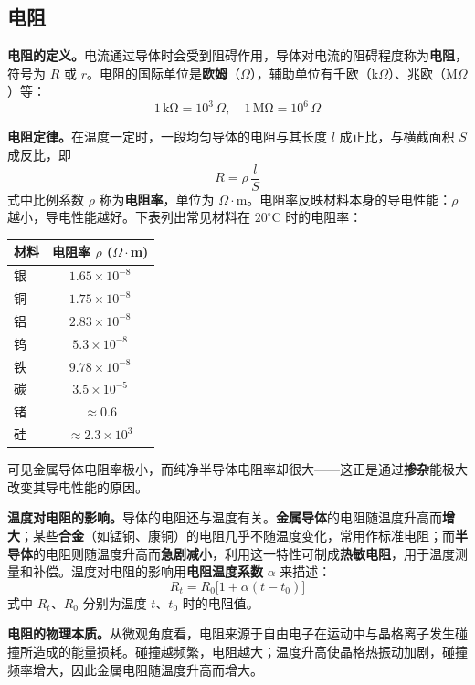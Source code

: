 \documentclass[12pt,UTF8]{ctexbook}
\begin{document}
\subsection{电阻}

\textbf{电阻的定义。}电流通过导体时会受到阻碍作用，导体对电流的阻碍程度称为\textbf{电阻}，符号为 $R$ 或 $r$。电阻的国际单位是\textbf{欧姆}（$\Omega$），辅助单位有千欧（k$\Omega$）、兆欧（M$\Omega$）等：
\[
1\,\mathrm{k\Omega} = 10^3\,\Omega, \quad 1\,\mathrm{M\Omega} = 10^6\,\Omega
\]

\textbf{电阻定律。}在温度一定时，一段均匀导体的电阻与其长度 $l$ 成正比，与横截面积 $S$ 成反比，即
\[
R = \rho \, \frac{l}{S}
\]
式中比例系数 $\rho$ 称为\textbf{电阻率}，单位为 $\Omega\cdot\mathrm{m}$。电阻率反映材料本身的导电性能：$\rho$ 越小，导电性能越好。下表列出常见材料在 $20^{\circ}\mathrm{C}$ 时的电阻率：

\begin{center}
\begin{tabular}{lc}
\hline
\textbf{材料} & \textbf{电阻率 $\rho$ ($\Omega\cdot$m)} \\
\hline
银 & $1.65 \times 10^{-8}$ \\
铜 & $1.75 \times 10^{-8}$ \\
铝 & $2.83 \times 10^{-8}$ \\
钨 & $5.3 \times 10^{-8}$ \\
铁 & $9.78 \times 10^{-8}$ \\
碳 & $3.5 \times 10^{-5}$ \\
锗 & $\approx 0.6$ \\
硅 & $\approx 2.3 \times 10^{3}$ \\
\hline
\end{tabular}
\end{center}

可见金属导体电阻率极小，而纯净半导体电阻率却很大——这正是通过\textbf{掺杂}能极大改变其导电性能的原因。

\textbf{温度对电阻的影响。}导体的电阻还与温度有关。\textbf{金属导体}的电阻随温度升高而\textbf{增大}；某些\textbf{合金}（如锰铜、康铜）的电阻几乎不随温度变化，常用作标准电阻；而\textbf{半导体}的电阻则随温度升高而\textbf{急剧减小}，利用这一特性可制成\textbf{热敏电阻}，用于温度测量和补偿。温度对电阻的影响用\textbf{电阻温度系数} $\alpha$ 来描述：
\[
R_t = R_0 \big[1 + \alpha (t - t_0)\big]
\]
式中 $R_t$、$R_0$ 分别为温度 $t$、$t_0$ 时的电阻值。

\textbf{电阻的物理本质。}从微观角度看，电阻来源于自由电子在运动中与晶格离子发生碰撞所造成的能量损耗。碰撞越频繁，电阻越大；温度升高使晶格热振动加剧，碰撞频率增大，因此金属电阻随温度升高而增大。
\end{document}
